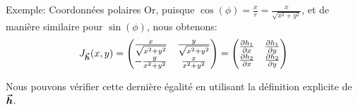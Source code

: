 \documentclass[a4paper]{article}
\begin{document}
\begin{parag}{Exemple: Coordonnées polaires}
    Or, puisque $\cos\left(\phi\right) = \frac{x}{r} = \frac{x}{\sqrt{x^2 + y^2}}$, et de manière similaire pour $\sin\left(\phi\right)$, nous obtenons:
    \[J_{\bvec{h}}\left(x, y\right) = \begin{pmatrix} \frac{x}{\sqrt{x^2 + y^2}} & \frac{y}{\sqrt{x^2 + y^2}} \\ -\frac{y}{x^2 + y^2} & \frac{x}{x^2 + y^2} \end{pmatrix} = \begin{pmatrix} \frac{\partial h_1}{\partial x} & \frac{\partial h_1}{\partial y} \\ \frac{\partial h_2}{\partial x} & \frac{\partial h_2}{\partial y} \end{pmatrix} \]

    Nous pouvons vérifier cette dernière égalité en utilisant la définition explicite de $\bm{\protect\vec{h}}$.
\end{parag}
\end{document}
